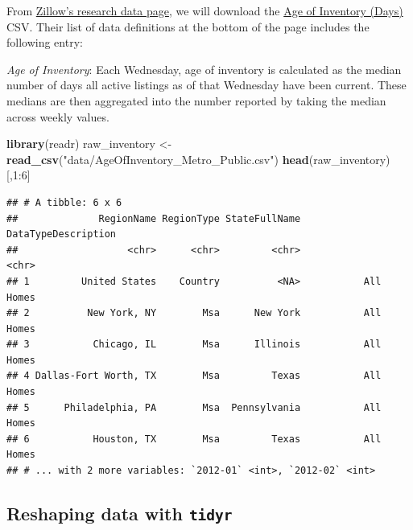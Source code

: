 \documentclass[]{book}
\newenvironment{Shaded}{\begin{snugshade}}{\end{snugshade}}
\newcommand{\KeywordTok}[1]{\textcolor[rgb]{0.13,0.29,0.53}{\textbf{{#1}}}}
\newcommand{\DecValTok}[1]{\textcolor[rgb]{0.00,0.00,0.81}{{#1}}}
\newcommand{\StringTok}[1]{\textcolor[rgb]{0.31,0.60,0.02}{{#1}}}
\newcommand{\NormalTok}[1]{{#1}}
\theoremstyle{definition}
\theoremstyle{definition}
\theoremstyle{remark}
\begin{document}
From
\href{https://www.zillow.com/research/data/\#other-metrics}{Zillow's
research data page}, we will download the
\href{http://files.zillowstatic.com/research/public/Metro/AgeOfInventory_Metro_Public.csv}{Age
of Inventory (Days)} CSV. Their list of data definitions at the bottom
of the page includes the following entry:

\emph{Age of Inventory}: Each Wednesday, age of inventory is calculated
as the median number of days all active listings as of that Wednesday
have been current. These medians are then aggregated into the number
reported by taking the median across weekly values.

\begin{Shaded}
\begin{Highlighting}[]
\KeywordTok{library}\NormalTok{(readr)}
\NormalTok{raw_inventory <-}\StringTok{ }\KeywordTok{read_csv}\NormalTok{(}\StringTok{"data/AgeOfInventory_Metro_Public.csv"}\NormalTok{)}
\KeywordTok{head}\NormalTok{(raw_inventory)[,}\DecValTok{1}\NormalTok{:}\DecValTok{6}\NormalTok{]}
\end{Highlighting}
\end{Shaded}

\begin{verbatim}
## # A tibble: 6 x 6
##              RegionName RegionType StateFullName DataTypeDescription
##                   <chr>      <chr>         <chr>               <chr>
## 1         United States    Country          <NA>           All Homes
## 2          New York, NY        Msa      New York           All Homes
## 3           Chicago, IL        Msa      Illinois           All Homes
## 4 Dallas-Fort Worth, TX        Msa         Texas           All Homes
## 5      Philadelphia, PA        Msa  Pennsylvania           All Homes
## 6           Houston, TX        Msa         Texas           All Homes
## # ... with 2 more variables: `2012-01` <int>, `2012-02` <int>
\end{verbatim}

\subsection{\texorpdfstring{Reshaping data with
\texttt{tidyr}}{Reshaping data with tidyr}}\label{reshaping-data-with-tidyr}
\end{document}

